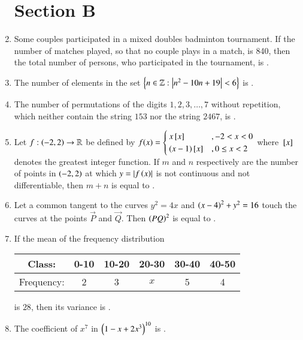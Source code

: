 \documentclass[journal]{IEEEtran}
\begin{document}
\begin{enumerate}[start=16]
\section*{Section B}
\item Some couples participated in a mixed doubles badminton tournament. If the number of matches played, so that no couple plays in a match, is 840, then the total number of persons, who participated in the tournament, is \underline{\hspace{1cm}}.
\item The number of elements in the set $\left\{n \in \mathbb{Z} :\left\vert n^2 - 10n + 19\right\vert < 6 \right\}$ is \underline{\hspace{1cm}}.
\item The number of permutations of the digits $1, 2, 3, \dots, 7$ without repetition, which neither contain the string $153$ nor the string $2467$, is \underline{\hspace{1cm}}.
\item Let $f: \left(-2, 2\right) \to \mathbb{R}$ be defined by
$f(x) = \begin{cases}
x{}\left[x\right] & , -2 < x < 0 \\
(x-1){}\left[x\right] & , 0 \leq x < 2
\end{cases}$
where ${}\left[x\right]$ denotes the greatest integer function. If $m$ and $n$ respectively are the number of points in $\left(-2, 2\right)$ at which $y =\left\vert f\left(x\right)\right\vert$ is not continuous and not differentiable, then $m + n$ is equal to \underline{\hspace{1cm}}.
\item Let a common tangent to the curves $y^2 = 4x$ and $\left(x - 4\right)^2 + y^2 = 16$ touch the curves at the points $\vec{P}$ and $\vec{Q}$. Then $\left(PQ\right)^2$ is equal to \underline{\hspace{1cm}}.
\item If the mean of the frequency distribution
\begin{table}[h!]
\centering
\begin{tabular}{|c|c|c|c|c|c|}
\hline
Class: & 0-10 & 10-20 & 20-30 & 30-40 & 40-50 \\
\hline
Frequency: & 2 & 3 & $x$ & 5 & 4 \\
\hline
\end{tabular}
\end{table}
is $28$, then its variance is \underline{\hspace{1cm}}.
\item The coefficient of $x^7$ in $\left(1 - x + 2x^3\right)^{10}$ is \underline{\hspace{1cm}}.

\end{enumerate}
\end{document}
